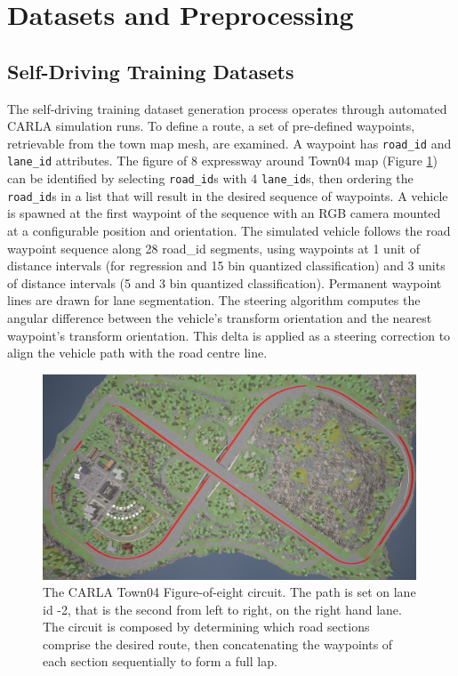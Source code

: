 \section{Datasets and Preprocessing}

\subsection{Self-Driving Training Datasets}
\label{methods:carla_gen_train_datasets}

The self-driving training dataset generation process operates through automated CARLA simulation runs. To define a route, a set of pre-defined waypoints, retrievable from the town map mesh, are examined. A waypoint has \texttt{road\_id} and \texttt{lane\_id} attributes. The figure of 8 expressway around Town04 map (Figure \ref{fig:Town04FigureOfEight}) can be identified by selecting \texttt{road\_id}s with 4 \texttt{lane\_id}s, then ordering the \texttt{road\_id}s in a list that will result in the desired sequence of waypoints. A vehicle is spawned at the first waypoint of the sequence with an RGB camera mounted at a configurable position and orientation.
The simulated vehicle follows the road waypoint sequence along 28 road\_id segments, using waypoints at 1 unit of distance intervals (for regression and 15 bin quantized classification) and 3 units of distance intervals (5 and 3 bin quantized classification). Permanent waypoint lines are drawn for lane segmentation. The steering algorithm computes the angular difference between the vehicle's transform orientation and the nearest waypoint's transform orientation. This delta is applied as a steering correction to align the vehicle path with the road centre line.

\begin{figure}[h]
\centering
\includegraphics[width=0.99\textwidth]{Figures/Methods/Town04FigureOfEight.png}
\caption{The CARLA Town04 Figure-of-eight circuit. The path is set on lane id -2, that is the second from left to right, on the right hand lane. The circuit is composed by determining which road sections comprise the desired route, then concatenating the waypoints of each section sequentially to form a full lap.}
\label{fig:Town04FigureOfEight}
\end{figure}

